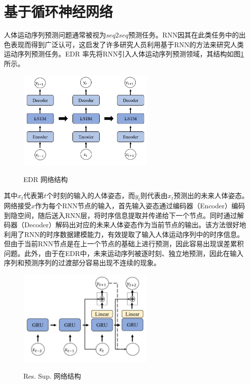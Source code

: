 \section{基于循环神经网络}
人体运动序列预测问题通常被视为$seq2seq$预测任务。RNN因其在此类任务中的出色表现而得到广泛认可，这启发了许多研究人员利用基于RNN的方法来研究人类运动序列预测任务。EDR \parencite{fragkiadaki2015recurrent} 率先将RNN引入人体运动序列预测领域，其结构如图\ref{fig:EDR}所示。
\begin{figure}[ht]
    \centering
    \includegraphics[width=0.6\textwidth]{FigMa/EDR.png}\\
    \vspace{-0.3cm}
    \caption{EDR 网络结构}
    \label{fig:EDR}
\end{figure}
其中$x_t$代表第$t$个时刻的输入的人体姿态，而$y_t$则代表由$x_t$预测出的未来人体姿态。网络接受$x$作为每个RNN节点的输入，首先输入姿态通过编码器（Encoder）编码到隐空间，随后送入RNN层，将时序信息提取并传递给下一个节点。同时通过解码器（Decoder）解码出对应的未来人体姿态作为当前节点的输出。该方法很好地利用了RNN的时序数据建模能力，有效提取了输入人体运动序列中的时序信息。但由于当前RNN节点是在上一个节点的基础上进行预测，因此容易出现误差累积问题。此外，由于在EDR中，未来运动序列被逐时刻、独立地预测，因此在输入序列和预测序列的过渡部分容易出现不连续的现象。
\begin{figure}[ht]
    \centering
    \includegraphics[width=0.6\textwidth]{FigMa/ResSup.png}\\
    \vspace{-0.3cm}
    \caption{Res. Sup. 网络结构}
    \label{fig:ResSup}
\end{figure}
